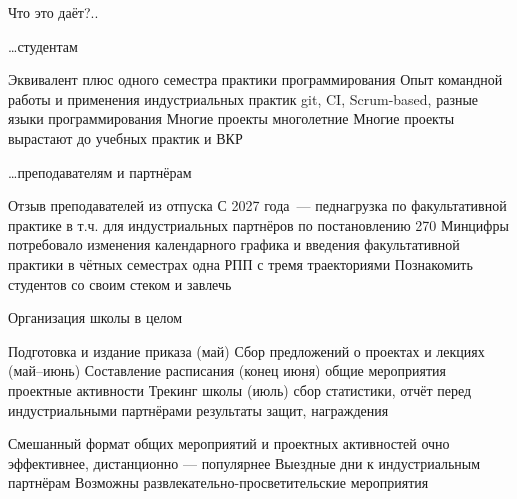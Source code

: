 \documentclass[xetex,mathserif,serif,aspectratio=1610]{beamer}
\begin{document}
    \begin{frame}{Что это даёт?..}
        \begin{block}{\ldots студентам}
        \begin{outline}
            \1 Эквивалент плюс одного семестра практики программирования
            \1 Опыт командной работы и применения индустриальных практик
                \2 git, CI, Scrum-based, разные языки программирования
            \1 Многие проекты многолетние
            \1 Многие проекты вырастают до учебных практик и ВКР
        \end{outline}
        \end{block}

        \pause

        \begin{block}{\ldots преподавателям и партнёрам}
        \begin{outline}
            \1 Отзыв преподавателей из отпуска
            \1 С 2027 года~--- педнагрузка по факультативной практике
                \2 в т.ч. для индустриальных партнёров по постановлению 270 Минцифры
                \2 потребовало изменения календарного графика и введения факультативной практики в чётных семестрах
                    \3 одна РПП с тремя траекториями
            \1 Познакомить студентов со своим стеком и завлечь
        \end{outline}
        \end{block}
    \end{frame}

    \begin{frame}{Организация школы в целом}
        \begin{outline}
            \1 Подготовка и издание приказа (май)
            \1 Сбор предложений о проектах и лекциях (май--июнь)
            \1 Составление расписания (конец июня)
                \2 общие мероприятия
                \2 проектные активности
            \1 Трекинг школы (июль)
                \2 сбор статистики, отчёт перед индустриальными партнёрами
                \2 результаты защит, награждения
        \end{outline}

        \pause

        \begin{outline}
            \1 Смешанный формат общих мероприятий и проектных активностей
                \2 очно эффективнее, дистанционно --- популярнее
            \1 Выездные дни к индустриальным партнёрам
            \1 Возможны развлекательно-просветительские мероприятия
        \end{outline}
    \end{frame}
\end{document}
